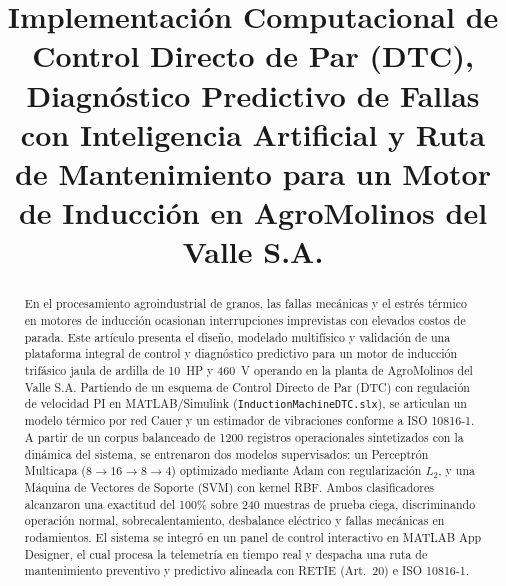 \documentclass[conference]{IEEEtran}
\begin{document}
\title{Implementación Computacional de Control Directo de Par (DTC), Diagnóstico Predictivo de Fallas con Inteligencia Artificial y Ruta de Mantenimiento para un Motor de Inducción en AgroMolinos del Valle S.A.}

\author{
}

\maketitle

\renewcommand\abstractname{Resumen}
\begin{abstract}
En el procesamiento agroindustrial de granos, las fallas mecánicas y el estrés térmico en motores de inducción ocasionan interrupciones imprevistas con elevados costos de parada. Este artículo presenta el diseño, modelado multifísico y validación de una plataforma integral de control y diagnóstico predictivo para un motor de inducción trifásico jaula de ardilla de 10~HP y 460~V operando en la planta de AgroMolinos del Valle S.A. Partiendo de un esquema de Control Directo de Par (DTC) con regulación de velocidad PI en MATLAB/Simulink (\texttt{InductionMachineDTC.slx}), se articulan un modelo térmico por red Cauer y un estimador de vibraciones conforme a ISO 10816-1. A partir de un corpus balanceado de 1200 registros operacionales sintetizados con la dinámica del sistema, se entrenaron dos modelos supervisados: un Perceptrón Multicapa ($8 \to 16 \to 8 \to 4$) optimizado mediante Adam con regularización $L_2$, y una Máquina de Vectores de Soporte (SVM) con kernel RBF. Ambos clasificadores alcanzaron una exactitud del 100\% sobre 240 muestras de prueba ciega, discriminando operación normal, sobrecalentamiento, desbalance eléctrico y fallas mecánicas en rodamientos. El sistema se integró en un panel de control interactivo en MATLAB App Designer, el cual procesa la telemetría en tiempo real y despacha una ruta de mantenimiento preventivo y predictivo alineada con RETIE (Art.~20) e ISO 10816-1.
\end{abstract}
\end{document}

